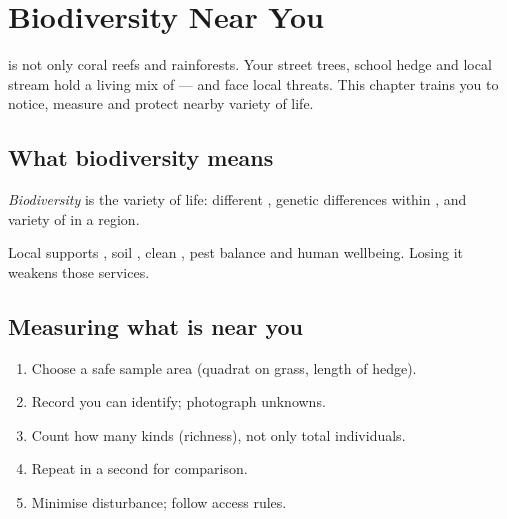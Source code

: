 \chapter{Biodiversity Near You}\label{ch:g6:biodiversity}

 is not only coral reefs and rainforests. Your street trees,
school hedge and local stream hold a living mix of  --- and face
local threats. This chapter trains you to notice, measure and protect
nearby variety of life.

\section{What biodiversity means}

\begin{definition}[Biodiversity]\label{def:g6:biodiversity:def}
\emph{Biodiversity} is the variety of life:
different , genetic differences within , and variety of
 in a region.
\end{definition}

\begin{proposition}\label{prop:g6:biodiversity:value}
Local  supports , soil , clean ,
pest balance and human wellbeing. Losing it weakens those services.
\end{proposition}
\admitted


\section{Measuring what is near you}

\begin{method}\label{met:g6:biodiversity:survey}
\begin{enumerate}
  \item Choose a safe sample area (quadrat on grass, length of hedge).
  \item Record  you can identify; photograph unknowns.
  \item Count how many kinds (richness), not only total individuals.
  \item Repeat in a second  for comparison.
  \item Minimise disturbance; follow access rules.
\end{enumerate}
\end{method}

